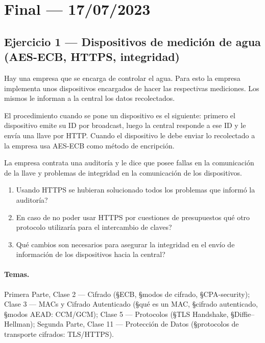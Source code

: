 \section{Final --- 17/07/2023}

\subsection{Ejercicio 1 --- Dispositivos de medición de agua (AES-ECB, HTTPS, integridad)}

\begin{consigna}
Hay una empresa que se encarga de controlar el agua. Para esto la empresa implementa unos
dispositivos encargados de hacer las respectivas mediciones. Los mismos le informan a la
central los datos recolectados.

El procedimiento cuando se pone un dispositivo es el siguiente: primero el dispositivo emite
su ID por broadcast, luego la central responde a ese ID y le envía una llave por HTTP. Cuando
el dispositivo le debe enviar lo recolectado a la empresa usa AES-ECB como método de
encripción.

La empresa contrata una auditoría y le dice que posee fallas en la comunicación de la llave y
problemas de integridad en la comunicación de los dispositivos.
\begin{enumerate}
  \item[a)] Usando HTTPS \textquestiondown{}se hubieran solucionado todos los problemas que informó la
  auditoría?
  \item[b)] En caso de no poder usar HTTPS por cuestiones de presupuestos \textquestiondown{}qué otro protocolo
  utilizaría para el intercambio de claves?
  \item[c)] \textquestiondown{}Qué cambios son necesarios para asegurar la integridad en el envío de información
  de los dispositivos hacia la central?
\end{enumerate}
\end{consigna}

\paragraph{Temas.}
Primera Parte, Clase 2 --- Cifrado (\S ECB, \S modos de cifrado, \S CPA-security); Clase 3 ---
MACs y Cifrado Autenticado (\S qué es un MAC, \S cifrado autenticado, \S modos AEAD:
CCM/GCM); Clase 5 --- Protocolos (\S TLS Handshake, \S Diffie--Hellman); Segunda Parte,
Clase 11 --- Protección de Datos (\S protocolos de transporte cifrados: TLS/HTTPS).

